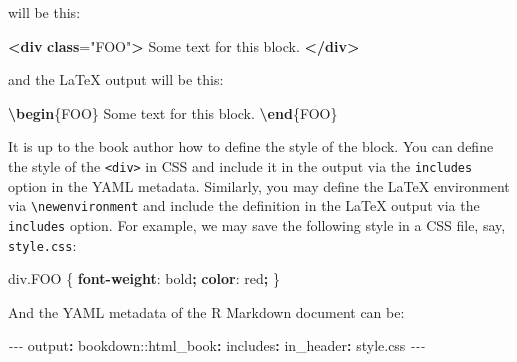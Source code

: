 \documentclass[
  12pt,
]{krantz}
\newenvironment{Shaded}{\begin{snugshade}}{\end{snugshade}}
\newcommand{\AttributeTok}[1]{\textcolor[rgb]{0.77,0.63,0.00}{#1}}
\newcommand{\ConstantTok}[1]{\textcolor[rgb]{0.00,0.00,0.00}{#1}}
\newcommand{\DecValTok}[1]{\textcolor[rgb]{0.00,0.00,0.81}{#1}}
\newcommand{\ErrorTok}[1]{\textcolor[rgb]{0.64,0.00,0.00}{\textbf{#1}}}
\newcommand{\ExtensionTok}[1]{#1}
\newcommand{\FunctionTok}[1]{\textcolor[rgb]{0.00,0.00,0.00}{#1}}
\newcommand{\KeywordTok}[1]{\textcolor[rgb]{0.13,0.29,0.53}{\textbf{#1}}}
\newcommand{\NormalTok}[1]{#1}
\newcommand{\OperatorTok}[1]{\textcolor[rgb]{0.81,0.36,0.00}{\textbf{#1}}}
\newcommand{\OtherTok}[1]{\textcolor[rgb]{0.56,0.35,0.01}{#1}}
\newcommand{\PreprocessorTok}[1]{\textcolor[rgb]{0.56,0.35,0.01}{\textit{#1}}}
\newcommand{\StringTok}[1]{\textcolor[rgb]{0.31,0.60,0.02}{#1}}
\theoremstyle{definition}
\theoremstyle{definition}
\theoremstyle{definition}
\theoremstyle{definition}
\theoremstyle{remark}
\begin{document}
will be this:

\begin{Shaded}
\begin{Highlighting}[]
\KeywordTok{\textless{}div} \ErrorTok{class}\OtherTok{=}\StringTok{"FOO"}\KeywordTok{\textgreater{}}
\NormalTok{Some text for this block.}
\KeywordTok{\textless{}/div\textgreater{}}
\end{Highlighting}
\end{Shaded}

and the LaTeX output will be this:

\begin{Shaded}
\begin{Highlighting}[]
\KeywordTok{\textbackslash{}begin}\NormalTok{\{}\ExtensionTok{FOO}\NormalTok{\}}
\NormalTok{Some text for this block.}
\KeywordTok{\textbackslash{}end}\NormalTok{\{}\ExtensionTok{FOO}\NormalTok{\}}
\end{Highlighting}
\end{Shaded}

It is up to the book author how to define the style of the block. You can define the style of the \texttt{\textless{}div\textgreater{}} in CSS and include it in the output via the \texttt{includes} option in the YAML metadata. Similarly, you may define the LaTeX environment via \texttt{\textbackslash{}newenvironment} and include the definition in the LaTeX output via the \texttt{includes} option. For example, we may save the following style in a CSS file, say, \texttt{style.css}:

\begin{Shaded}
\begin{Highlighting}[]
\NormalTok{div}\FunctionTok{.FOO}\NormalTok{ \{}
  \KeywordTok{font{-}weight}\NormalTok{: }\DecValTok{bold}\OperatorTok{;}
  \KeywordTok{color}\NormalTok{: }\ConstantTok{red}\OperatorTok{;}
\NormalTok{\}}
\end{Highlighting}
\end{Shaded}

And the YAML metadata of the R Markdown document can be:

\begin{Shaded}
\begin{Highlighting}[]
\PreprocessorTok{{-}{-}{-}}
\FunctionTok{output}\KeywordTok{:}
\AttributeTok{  bookdown:}\FunctionTok{:html\_book}\KeywordTok{:}
\AttributeTok{    }\FunctionTok{includes}\KeywordTok{:}
\AttributeTok{      }\FunctionTok{in\_header}\KeywordTok{:}\AttributeTok{ style.css}
\PreprocessorTok{{-}{-}{-}}
\end{Highlighting}
\end{Shaded}
\end{document}
